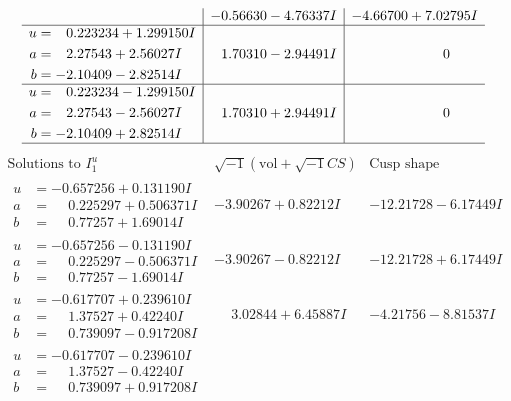 \documentclass[1p]{elsarticle_modified}
\theoremstyle{definition}
\newcommand{\I}{\sqrt{-1}}
\begin{document}
$$\begin{array}{c|c|c}
 & -0.56630 - 4.76337 I & -4.66700 + 7.02795 I \\ \hline\begin{aligned}
u &= \phantom{-}0.223234 + 1.299150 I \\
a &= \phantom{-}2.27543 + 2.56027 I \\
b &= -2.10409 - 2.82514 I\end{aligned}
 & \phantom{-}1.70310 - 2.94491 I & \phantom{-0.000000 } 0 \\ \hline\begin{aligned}
u &= \phantom{-}0.223234 - 1.299150 I \\
a &= \phantom{-}2.27543 - 2.56027 I \\
b &= -2.10409 + 2.82514 I\end{aligned}
 & \phantom{-}1.70310 + 2.94491 I & \phantom{-0.000000 } 0\\
 \hline 
 \end{array}$$\newpage$$\begin{array}{c|c|c}  
\text{Solutions to }I^u_{1}& \I (\text{vol} + \sqrt{-1}CS) & \text{Cusp shape}\\
 \hline 
\begin{aligned}
u &= -0.657256 + 0.131190 I \\
a &= \phantom{-}0.225297 + 0.506371 I \\
b &= \phantom{-}0.77257 + 1.69014 I\end{aligned}
 & -3.90267 + 0.82212 I & -12.21728 - 6.17449 I \\ \hline\begin{aligned}
u &= -0.657256 - 0.131190 I \\
a &= \phantom{-}0.225297 - 0.506371 I \\
b &= \phantom{-}0.77257 - 1.69014 I\end{aligned}
 & -3.90267 - 0.82212 I & -12.21728 + 6.17449 I \\ \hline\begin{aligned}
u &= -0.617707 + 0.239610 I \\
a &= \phantom{-}1.37527 + 0.42240 I \\
b &= \phantom{-}0.739097 - 0.917208 I\end{aligned}
 & \phantom{-}3.02844 + 6.45887 I & -4.21756 - 8.81537 I \\ \hline\begin{aligned}
u &= -0.617707 - 0.239610 I \\
a &= \phantom{-}1.37527 - 0.42240 I \\
b &= \phantom{-}0.739097 + 0.917208 I\end{aligned}

\end{array}$$
\end{document}
